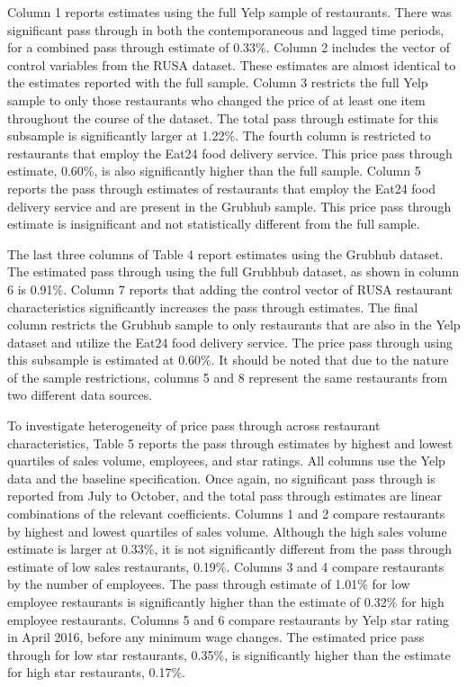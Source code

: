 \documentclass[11pt]{article}
\begin{document}
Column 1 reports estimates using the full Yelp sample of restaurants. There was significant pass through in both the contemporaneous and lagged time periods, for a combined pass through estimate of 0.33\%. Column 2 includes the vector of control variables from the RUSA dataset. These estimates are almost identical to the estimates reported with the full sample. Column 3 restricts the full Yelp sample to only those restaurants who changed the price of at least one item throughout the course of the dataset. The total pass through estimate for this subsample is significantly larger at 1.22\%. The fourth column is restricted to restaurants that employ the Eat24 food delivery service. This price pass through estimate, 0.60\%, is also significantly higher than the full sample. Column 5 reports the pass through estimates of restaurants that employ the Eat24 food delivery service and are present in the Grubhub sample. This price pass through estimate is insignificant and not statistically different from the full sample. 

The last three columns of Table 4 report estimates using the Grubhub dataset. The estimated pass through using the full Grubhbub dataset, as shown in column 6 is 0.91\%. Column 7 reports that adding the control vector of RUSA restaurant characteristics significantly increases the pass through estimates. The final column restricts the Grubhub sample to only restaurants that are also in the Yelp dataset and utilize the Eat24 food delivery service. The price pass through using this subsample is estimated at 0.60\%. It should be noted that due to the nature of the sample restrictions, columns 5 and 8 represent the same restaurants from two different data sources. 


To investigate heterogeneity of price pass through across restaurant characteristics, Table 5 reports the pass through estimates by highest and lowest quartiles of sales volume, employees, and star ratings. All columns use the Yelp data and the baseline specification. Once again, no significant pass through is reported from July to October, and the total pass through estimates are linear combinations of the relevant coefficients. Columns 1 and 2 compare restaurants by highest and lowest quartiles of sales volume. Although the high sales volume estimate is larger at 0.33\%, it is not significantly different from the pass through estimate of low sales restaurants, 0.19\%. Columns 3 and 4 compare restaurants by the number of employees. The pass through estimate of 1.01\% for low employee restaurants is significantly higher than the estimate of 0.32\% for high employee restaurants. Columns 5 and 6 compare restaurants by Yelp star rating in April 2016, before any minimum wage changes. The estimated price pass through for low star restaurants, 0.35\%, is significantly higher than the estimate for high star restaurants, 0.17\%.       
\end{document}
